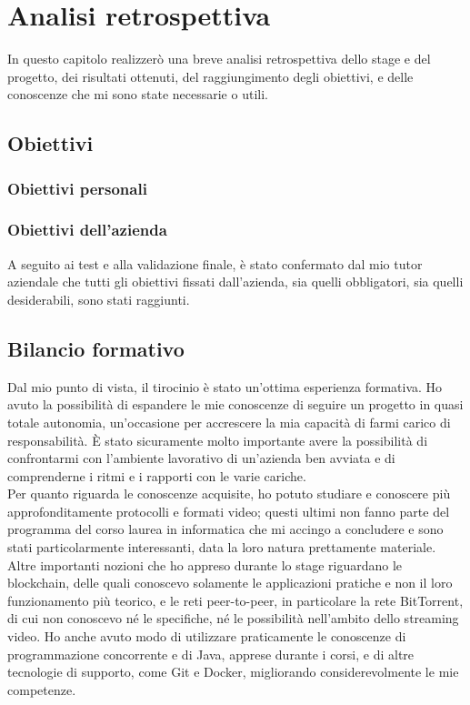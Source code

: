 \chapter{Analisi retrospettiva}
In questo capitolo realizzerò una breve analisi retrospettiva dello stage e del progetto, dei risultati ottenuti, del raggiungimento degli obiettivi, e delle conoscenze che mi sono state necessarie o utili.

\section{Obiettivi}
\subsection{Obiettivi personali}
\subsection{Obiettivi dell'azienda}
A seguito ai test e alla validazione finale, è stato confermato dal mio tutor aziendale che tutti gli obiettivi fissati dall'azienda, sia quelli obbligatori, sia quelli desiderabili, sono stati raggiunti.

\section{Bilancio formativo}
Dal mio punto di vista, il tirocinio è stato un'ottima esperienza formativa. Ho avuto la possibilità di espandere le mie conoscenze di seguire un progetto in quasi totale autonomia, un'occasione per accrescere la mia capacità di farmi carico di responsabilità. È stato sicuramente molto importante avere la possibilità di confrontarmi con l'ambiente lavorativo di un'azienda ben avviata e di comprenderne i ritmi e i rapporti con le varie cariche.
\\
Per quanto riguarda le conoscenze acquisite, ho potuto studiare e conoscere più approfonditamente protocolli e formati video; questi ultimi non fanno parte del programma del corso laurea in informatica che mi accingo a concludere e sono stati particolarmente interessanti, data la loro natura prettamente materiale. Altre importanti nozioni che ho appreso durante lo stage riguardano le blockchain, delle quali conoscevo solamente le applicazioni pratiche e non il loro funzionamento più teorico, e le reti peer-to-peer, in particolare la rete BitTorrent, di cui non conoscevo né le specifiche, né le possibilità nell'ambito dello streaming video. Ho anche avuto modo di utilizzare praticamente le conoscenze di programmazione concorrente e di Java, apprese durante i corsi, e di altre tecnologie di supporto, come Git e Docker, migliorando considerevolmente le mie competenze.

